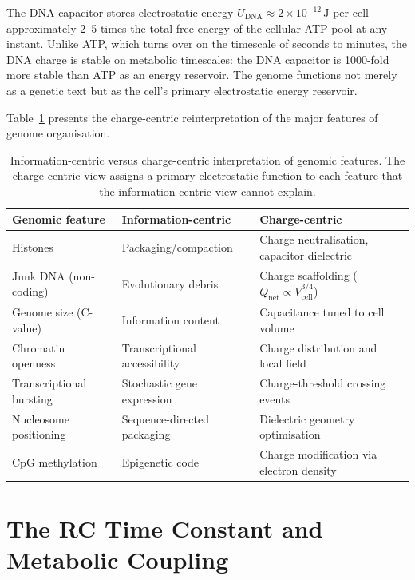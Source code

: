 \begin{keyresult}
The DNA capacitor stores electrostatic energy
$U_{\mathrm{DNA}} \approx 2\times 10^{-12}\,\mathrm{J}$ per cell ---
approximately 2--5 times the total free energy of the cellular ATP pool
at any instant. Unlike ATP, which turns over on the timescale of seconds
to minutes, the DNA charge is stable on metabolic timescales: the DNA
capacitor is 1000-fold more stable than ATP as an energy reservoir. The
genome functions not merely as a genetic text but as the cell's primary
electrostatic energy reservoir.
\end{keyresult}

Table~\ref{tab:charge_centric} presents the charge-centric reinterpretation
of the major features of genome organisation.

\begin{table}[htbp]
\centering
\caption{Information-centric versus charge-centric interpretation of
genomic features. The charge-centric view assigns a primary electrostatic
function to each feature that the information-centric view cannot explain.}
\label{tab:charge_centric}
\small
\begin{tabular}{lll}
\toprule
Genomic feature & Information-centric & Charge-centric \\
\midrule
Histones & Packaging/compaction & Charge neutralisation, capacitor dielectric \\
Junk DNA (non-coding) & Evolutionary debris & Charge scaffolding ($Q_{\mathrm{net}} \propto V_{\mathrm{cell}}^{3/4}$) \\
Genome size (C-value) & Information content & Capacitance tuned to cell volume \\
Chromatin openness & Transcriptional accessibility & Charge distribution and local field \\
Transcriptional bursting & Stochastic gene expression & Charge-threshold crossing events \\
Nucleosome positioning & Sequence-directed packaging & Dielectric geometry optimisation \\
CpG methylation & Epigenetic code & Charge modification via electron density \\
\bottomrule
\end{tabular}
\end{table}

\section{The RC Time Constant and Metabolic Coupling}
\label{sec:rc_coupling}

